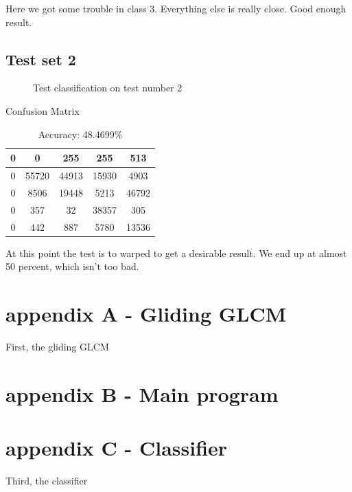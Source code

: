 \documentclass{article}
\begin{document}
	Here we got some trouble in class 3. Everything else is really close. Good enough result.
	\newpage 
\subsection{Test set 2}

	\begin{figure}[h!]%
		\centering
    	\caption{Test classification on test number 2}%
    	\label{fig:f2}%
	\end{figure}
	\begin{table}[h!]%
\centering
Confusion Matrix\\
\begin{tabular}{c | c | c | c | c}
  0  & 0     & 255   & 255   & 513   \\\hline
  0  & 55720 & 44913 & 15930 & 4903  \\\hline
  0  & 8506  & 19448 & 5213  & 46792 \\\hline
  0  & 357   & 32    & 38357 & 305   \\\hline
  0  & 442   & 887   & 5780  & 13536 \\\hline
\end{tabular}
\caption {Accuracy: 48.4699\%}
\end{table}
	At this point the test is to warped to get a desirable result. We end up at almost 50 percent, which isn't too bad.


\newpage
\newpage
\newpage


\section{appendix A - Gliding GLCM}
	First, the gliding GLCM
	

	\newpage
\section{appendix B - Main program}
	

	\newpage
\section{appendix C - Classifier}
	Third, the classifier 
	
    
\end{document}
